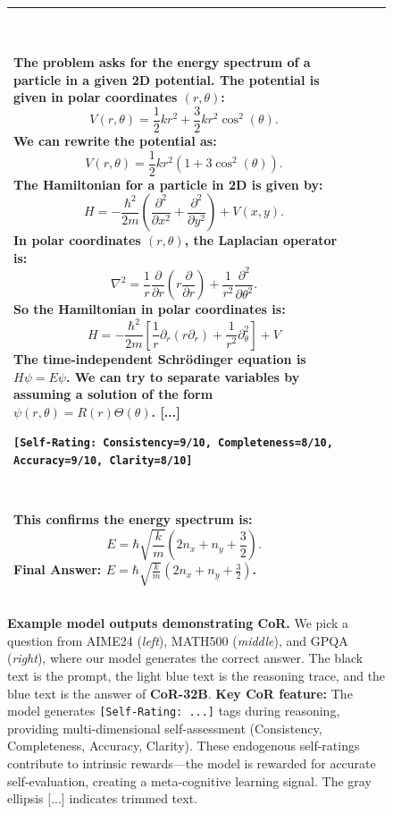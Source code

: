 \documentclass{article}
\theoremstyle{plain}
\theoremstyle{definition}
\theoremstyle{remark}
\newcommand{\model}{\textbf{CoR-32B}}
\begin{document}
\begin{figure}[p]
\begin{tabular}{@{}p{}p{}p{}@{}}
~ 


\textcolor{defaultlightblue}{
The problem asks for the energy spectrum of a particle in a given 2D potential. The potential is given in polar coordinates $(r, \theta)$:
$$V(r, \theta) = \frac{1}{2} kr^2 + \frac{3}{2} kr^2 \cos^2(\theta).$$
We can rewrite the potential as:
$$V(r, \theta) = \frac{1}{2} kr^2 (1 + 3\cos^2(\theta)).$$
}
\textcolor{defaultlightblue}{
The Hamiltonian for a particle in 2D is given by:
$$H = -\frac{\hbar^2}{2m} \left( \frac{\partial^2}{\partial x^2} + \frac{\partial^2}{\partial y^2} \right) + V(x, y).$$
In polar coordinates $(r, \theta)$, the Laplacian operator is:
{\small $$\nabla^2 = \frac{1}{r} \frac{\partial}{\partial r} \left(r \frac{\partial}{\partial r} \right) + \frac{1}{r^2} \frac{\partial^2}{\partial \theta^2}.$$}
So the Hamiltonian in polar coordinates is:
{\footnotesize $$H = -\frac{\hbar^2}{2m} \left[ \frac{1}{r} \partial_r \left(r \partial_r \right) + \frac{1}{r^2} \partial_\theta^2 \right] + V$$}
}
\textcolor{defaultlightblue}{
The time-independent Schrödinger equation is $H\psi = E\psi$.
We can try to separate variables by assuming a solution of the form $\psi(r, \theta) = R(r)\Theta(\theta)$. \textcolor[HTML]{808080}{[...]}
}

\texttt{\small [Self-Rating: Consistency=9/10, Completeness=8/10, Accuracy=9/10, Clarity=8/10]}

~

\textcolor{defaultblue}{
This confirms the energy spectrum is:
$$E = \hbar\sqrt{\frac{k}{m}} \left(2n_x + n_y + \frac{3}{2}\right).$$
Final Answer: $E = \hbar\sqrt{\frac{k}{m}} \left(2n_x + n_y + \frac{3}{2}\right)$.
}
\\
\bottomrule
\end{tabular}
\vspace{-5pt}
\caption{\textbf{Example model outputs demonstrating CoR.} We pick a question from AIME24 (\textit{left}), MATH500 (\textit{middle}), and GPQA (\textit{right}), where our model generates the correct answer. The black text is the prompt, the \textcolor{defaultlightblue}{light blue} text is the reasoning trace, and the \textcolor{defaultblue}{blue} text is the answer of \model{}. \textbf{Key CoR feature:} The model generates \texttt{[Self-Rating: ...]} tags during reasoning, providing multi-dimensional self-assessment (Consistency, Completeness, Accuracy, Clarity). These endogenous self-ratings contribute to intrinsic rewards—the model is rewarded for accurate self-evaluation, creating a meta-cognitive learning signal. The gray ellipsis \textcolor[HTML]{808080}{[...]} indicates trimmed text.}
\label{fig:ex}
\end{figure}
\end{document}
